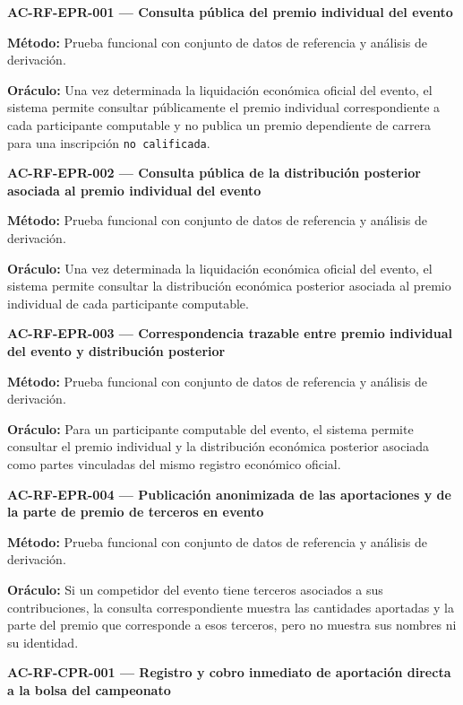 \documentclass[10pt,letterpaper]{article}
\begin{document}
\noindent\textbf{AC-RF-EPR-001 --- Consulta pública del premio individual del evento}\par
\textbf{Método:} Prueba funcional con conjunto de datos de referencia y análisis de derivación.\par
\textbf{Oráculo:} Una vez determinada la liquidación económica oficial del evento, el sistema permite consultar públicamente el premio individual correspondiente a cada participante computable y no publica un premio dependiente de carrera para una inscripción \texttt{no calificada}.\par\vspace{0.45em}
\noindent\textbf{AC-RF-EPR-002 --- Consulta pública de la distribución posterior asociada al premio individual del evento}\par
\textbf{Método:} Prueba funcional con conjunto de datos de referencia y análisis de derivación.\par
\textbf{Oráculo:} Una vez determinada la liquidación económica oficial del evento, el sistema permite consultar la distribución económica posterior asociada al premio individual de cada participante computable.\par\vspace{0.45em}
\noindent\textbf{AC-RF-EPR-003 --- Correspondencia trazable entre premio individual del evento y distribución posterior}\par
\textbf{Método:} Prueba funcional con conjunto de datos de referencia y análisis de derivación.\par
\textbf{Oráculo:} Para un participante computable del evento, el sistema permite consultar el premio individual y la distribución económica posterior asociada como partes vinculadas del mismo registro económico oficial.\par\vspace{0.45em}
\noindent\textbf{AC-RF-EPR-004 --- Publicación anonimizada de las aportaciones y de la parte de premio de terceros en evento}\par
\textbf{Método:} Prueba funcional con conjunto de datos de referencia y análisis de derivación.\par
\textbf{Oráculo:} Si un competidor del evento tiene terceros asociados a sus contribuciones, la consulta correspondiente muestra las cantidades aportadas y la parte del premio que corresponde a esos terceros, pero no muestra sus nombres ni su identidad.\par\vspace{0.45em}
\noindent\textbf{AC-RF-CPR-001 --- Registro y cobro inmediato de aportación directa a la bolsa del campeonato}\par
\end{document}
